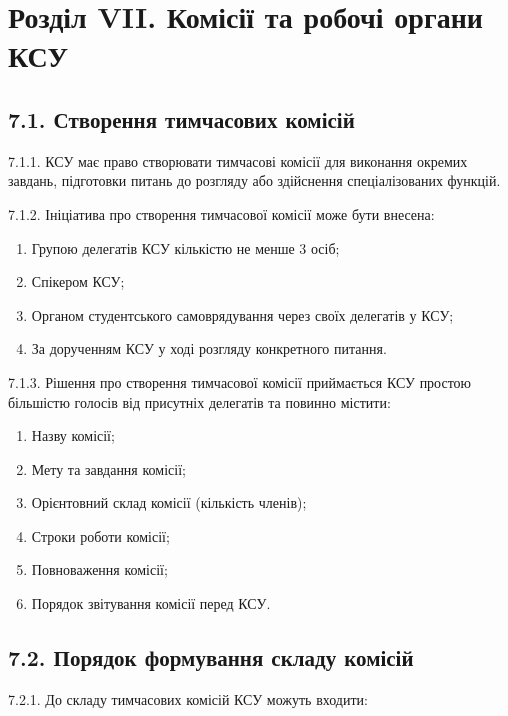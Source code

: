 \section*{Розділ VII. Комісії та робочі органи КСУ}

\subsection*{7.1. Створення тимчасових комісій}
    7.1.1. КСУ має право створювати тимчасові комісії для виконання окремих завдань, підготовки питань до розгляду або здійснення спеціалізованих функцій.

    7.1.2. Ініціатива про створення тимчасової комісії може бути внесена:

        \begin{enumerate}[label=\alph*)]
            \item Групою делегатів КСУ кількістю не менше 3 осіб;
            \item Спікером КСУ;
            \item Органом студентського самоврядування через своїх делегатів у КСУ;
            \item За дорученням КСУ у ході розгляду конкретного питання.
        \end{enumerate}

    7.1.3. Рішення про створення тимчасової комісії приймається КСУ простою більшістю голосів від присутніх делегатів та повинно містити:

        \begin{enumerate}[label=\alph*)]
            \item Назву комісії;
            \item Мету та завдання комісії;
            \item Орієнтовний склад комісії (кількість членів);
            \item Строки роботи комісії;
            \item Повноваження комісії;
            \item Порядок звітування комісії перед КСУ.
        \end{enumerate}

\subsection*{7.2. Порядок формування складу комісій}
    7.2.1. До складу тимчасових комісій КСУ можуть входити:

